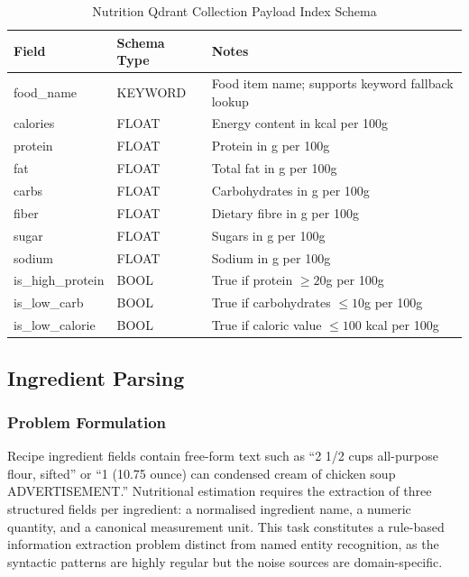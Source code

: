 \documentclass[conference]{IEEEtran}
\begin{document}
\begin{table}[H]
\caption{Nutrition Qdrant Collection Payload Index Schema}
\label{tab:qdrant_schema}
\centering
\footnotesize
\begin{tabular}{p{1.8cm} p{1.6cm} p{4.0cm}}
\toprule
\textbf{Field} & \textbf{Schema Type} & \textbf{Notes} \\
\midrule

food\_name & KEYWORD &
Food item name; supports keyword fallback lookup \\

calories & FLOAT &
Energy content in kcal per 100g \\

protein & FLOAT &
Protein in g per 100g \\

fat & FLOAT &
Total fat in g per 100g \\

carbs & FLOAT &
Carbohydrates in g per 100g \\

fiber & FLOAT &
Dietary fibre in g per 100g \\

sugar & FLOAT &
Sugars in g per 100g \\

sodium & FLOAT &
Sodium in g per 100g \\

is\_high\_protein & BOOL &
True if protein $\geq 20$g per 100g \\

is\_low\_carb & BOOL &
True if carbohydrates $\leq 10$g per 100g \\

is\_low\_calorie & BOOL &
True if caloric value $\leq 100$ kcal per 100g \\

\bottomrule
\end{tabular}
\end{table}

\subsection{Ingredient Parsing}
\subsubsection{Problem Formulation}
Recipe ingredient fields contain free-form text such as ``2 1/2 cups all-purpose flour, sifted'' or ``1 (10.75 ounce) can condensed cream of chicken soup ADVERTISEMENT.'' Nutritional estimation requires the extraction of three structured fields per ingredient: a normalised ingredient name, a numeric quantity, and a canonical measurement unit. This task constitutes a rule-based information extraction problem distinct from named entity recognition, as the syntactic patterns are highly regular but the noise sources are domain-specific.
\end{document}
